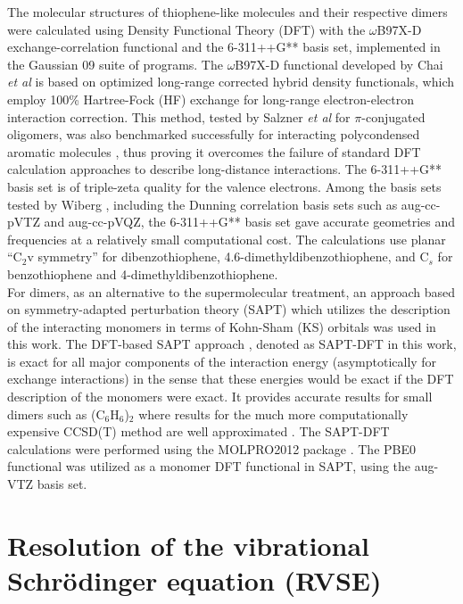 	The molecular structures of thiophene-like molecules and their respective dimers were calculated using Density Functional Theory (DFT) with the $\omega$B97X-D exchange-correlation functional and the   6-311++G** basis set, implemented in the Gaussian 09 suite of programs. The $\omega$B97X-D functional developed by Chai \textit{et al} \cite{chai2008systematic} is based on optimized long-range corrected hybrid density functionals, which employ 100\% Hartree-Fock (HF) exchange for long-range electron-electron interaction correction. This method, tested by Salzner \textit{et al} \cite{salzner2011improved} for $\pi$-conjugated oligomers, was also benchmarked successfully for interacting polycondensed aromatic molecules \cite{spillebout2014discerning}, thus proving it overcomes the failure of standard DFT calculation approaches to describe long-distance interactions. The 6-311++G** basis set is of triple-zeta quality for the valence electrons. Among the basis sets tested by Wiberg \cite{wiberg2004basis}, including the Dunning correlation basis sets such as aug-cc-pVTZ and aug-cc-pVQZ, the 6-311++G** basis set gave accurate geometries and frequencies at a relatively small computational cost. The calculations use planar “C$_{2}$v symmetry” for dibenzothiophene, 4.6-dimethyldibenzothiophene, and C$_{s}$ for benzothiophene and 4-dimethyldibenzothiophene.\\
	
	For dimers, as an alternative to the supermolecular treatment, an approach based on symmetry-adapted perturbation theory (SAPT) \cite{jeziorski1994perturbation} which utilizes the description of the interacting monomers in terms of Kohn-Sham (KS) orbitals was used in this work. The DFT-based SAPT approach \cite{hesselmann2005density}, denoted as SAPT-DFT in this work, is exact for all major components of the interaction energy (asymptotically for exchange interactions) in the sense that these energies would be exact if the DFT description of the monomers were exact. It provides accurate results for small dimers such as (C$_{6}$H$_{6}$)$_{2}$ where results for the much more computationally expensive CCSD(T) method are well approximated \cite{podeszwa2006potential}. The SAPT-DFT calculations were performed using the MOLPRO2012 package \cite{MOLPRO_brief}. The PBE0 functional \cite{adamo1999toward} was utilized as a monomer DFT functional in SAPT, using the aug-VTZ basis set.
	
	\section{Resolution of the vibrational Schr\"{o}dinger equation  (RVSE)}
	
